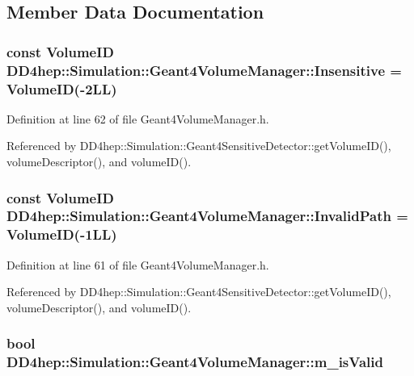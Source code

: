 \subsection{Member Data Documentation}
\hypertarget{class_d_d4hep_1_1_simulation_1_1_geant4_volume_manager_a3cd1e1946cee2db0e8a5a8240c9095be}{
\subsubsection[{Insensitive}]{\setlength{\rightskip}{0pt plus 5cm}const VolumeID {\bf DD4hep::Simulation::Geant4VolumeManager::Insensitive} = VolumeID(-\/2LL)}}
\label{class_d_d4hep_1_1_simulation_1_1_geant4_volume_manager_a3cd1e1946cee2db0e8a5a8240c9095be}


Definition at line 62 of file Geant4VolumeManager.h.

Referenced by DD4hep::Simulation::Geant4SensitiveDetector::getVolumeID(), volumeDescriptor(), and volumeID().\hypertarget{class_d_d4hep_1_1_simulation_1_1_geant4_volume_manager_a7a52a387bf1165cc296e76eeda618e9c}{
\subsubsection[{InvalidPath}]{\setlength{\rightskip}{0pt plus 5cm}const VolumeID {\bf DD4hep::Simulation::Geant4VolumeManager::InvalidPath} = VolumeID(-\/1LL)}}
\label{class_d_d4hep_1_1_simulation_1_1_geant4_volume_manager_a7a52a387bf1165cc296e76eeda618e9c}


Definition at line 61 of file Geant4VolumeManager.h.

Referenced by DD4hep::Simulation::Geant4SensitiveDetector::getVolumeID(), volumeDescriptor(), and volumeID().\hypertarget{class_d_d4hep_1_1_simulation_1_1_geant4_volume_manager_abbc8ba6689ff382f2803382ccaf3d6d6}{
\subsubsection[{m\_\-isValid}]{\setlength{\rightskip}{0pt plus 5cm}bool {\bf DD4hep::Simulation::Geant4VolumeManager::m\_\-isValid}}}
\label{class_d_d4hep_1_1_simulation_1_1_geant4_volume_manager_abbc8ba6689ff382f2803382ccaf3d6d6}


